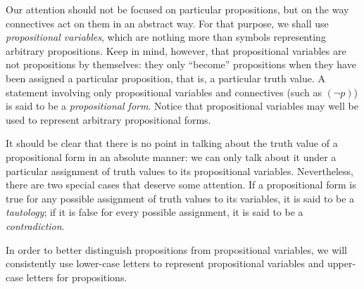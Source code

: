 \begin{para}
Our attention should not be focused on particular propositions, but on the way connectives act on them in an abstract way.
For that purpose, we shall use \emph{propositional variables}, which are nothing more than symbols representing arbitrary propositions.
Keep in mind, however, that propositional variables are not propositions by themselves: they only ``become'' propositions when they have been assigned a particular proposition, that is, a particular truth value.
A statement involving only propositional variables and connectives (such as $(\lnot p)$) is said to be a \emph{propositional form}.
Notice that propositional variables may well be used to represent arbitrary propositional forms.

It should be clear that there is no point in talking about the truth value of a propositional form in an absolute manner: we can only talk about it under a particular assignment of truth values to its propositional variables.
Nevertheless, there are two special cases that deserve some attention.
If a propositional form is true for any possible assignment of truth values to its variables, it is said to be a \emph{tautology}; if it is false for every possible assignment, it is said to be a \emph{contradiction}.

In order to better distinguish propositions from propositional variables, we will consistently use lower-case letters to represent propositional variables and upper-case letters for propositions.
\end{para}

